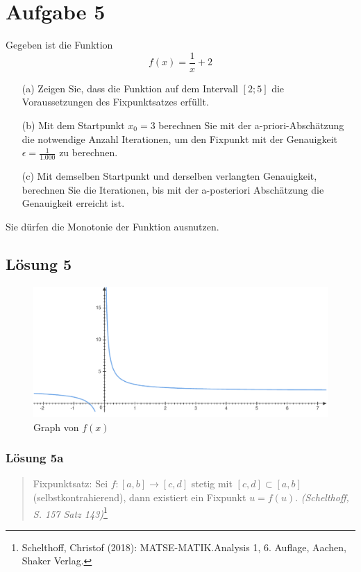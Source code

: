 \documentclass[main.tex]{subfiles}
\begin{document}
\section{Aufgabe 5}
Gegeben ist die Funktion
\begin{equation*}
    f(x) =\frac{1}{x} + 2
\end{equation*}

\begin{enumerate}
    \item[(a)] Zeigen Sie, dass die Funktion auf dem Intervall $[2;5]$ die Voraussetzungen des Fixpunktsatzes erfüllt.
    \item[(b)] Mit dem Startpunkt $x_{0} = 3$ berechnen Sie mit der a-priori-Abschätzung die notwendige Anzahl Iterationen, um den Fixpunkt mit der Genauigkeit $\epsilon =\frac{1}{1.000}$ zu berechnen.
    \item[(c)] Mit demselben Startpunkt und derselben verlangten Genauigkeit, berechnen Sie die Iterationen, bis mit der a-posteriori Abschätzung die Genauigkeit erreicht ist.
\end{enumerate}

Sie dürfen die Monotonie der Funktion ausnutzen.

\subsection{Lösung 5}

\begin{figure}[ht]
	\includegraphics[width=\linewidth]{fig-5.pdf}
	\caption{Graph von $f(x)$}
\end{figure}

\subsubsection{Lösung 5a}

\begin{quote}
    Fixpunktsatz: Sei $f:[ a,b]\rightarrow [ c,d]$ stetig mit $[ c,d] \subset [ a,b]$ (selbstkontrahierend), dann existiert ein Fixpunkt $u=f(u)$.
    \textit{(Schelthoff, S. 157 Satz 143)}\footnote{Schelthoff, Christof (2018): MATSE-MATIK.\@ Analysis 1, 6. Auflage, Aachen, Shaker Verlag.}
\end{quote}
\end{document}
